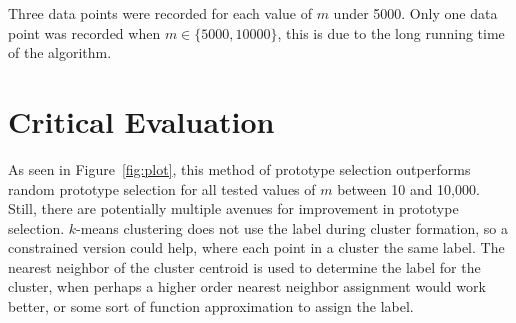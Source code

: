 \documentclass[letterpaper,10pt,onecolumn]{IEEEconf}
\begin{document}
Three data points were recorded for each value of $m$ under 5000. Only one data point was recorded when $m \in \{5000, 10000 \}$, this is due to the long running time of the algorithm.

\section{Critical Evaluation}

As seen in Figure~\ref{fig:plot}, this method of prototype selection outperforms random prototype selection for all tested values of $m$ between 10 and 10,000. Still, there are potentially multiple avenues for improvement in prototype selection. $k$-means clustering does not use the label during cluster formation, so a constrained version could help, where each point in a cluster the same label. The nearest neighbor of the cluster centroid is used to determine the label for the cluster, when perhaps a higher order nearest neighbor assignment would work better, or some sort of function approximation to assign the label. 
\end{document}
